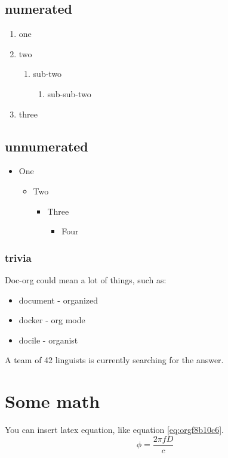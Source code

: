 \subsection{numerated}
\label{sec:org585e7bc}
\begin{enumerate}
\item one
\item two
\begin{enumerate}
\item sub-two
\begin{enumerate}
\item sub-sub-two
\end{enumerate}
\end{enumerate}
\item three
\end{enumerate}

\subsection{unnumerated}
\label{sec:orgac04487}
\begin{itemize}
\item One
\begin{itemize}
\item Two
\begin{itemize}
\item Three
\begin{itemize}
\item Four
\end{itemize}
\end{itemize}
\end{itemize}
\end{itemize}

\subsubsection{trivia}
\label{sec:org2cc0d2b}
Doc-org could mean a lot of things, such as:
\begin{itemize}
\item document - organized
\item docker - org mode
\item docile - organist
\end{itemize}
A team of 42 linguists is currently searching for the answer.

\section{Some math}
\label{sec:orgb79d55b}
You can insert latex equation, like equation \ref{eq:orgf8b10c6}.
\begin{equation}
\label{eq:orgf8b10c6}
\phi = \frac{2\pi fD}{c}
\end{equation}

